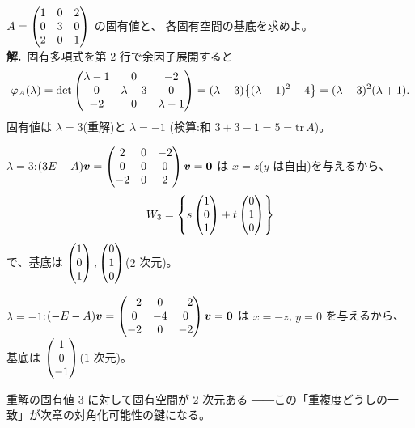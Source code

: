 \begin{rei}[例題・標準($3$ 次行列)]\label{rei:eigen-3x3}
$A = \begin{pmatrix}1 & 0 & 2 \\ 0 & 3 & 0 \\ 2 & 0 & 1\end{pmatrix}$ の固有値と、
各固有空間の基底を求めよ。\\
\textbf{解.}\ 固有多項式を第 $2$ 行で余因子展開すると
\[
\varphi_A(\lambda) = \det\begin{pmatrix}\lambda - 1 & 0 & -2 \\ 0 & \lambda - 3 & 0 \\
-2 & 0 & \lambda - 1\end{pmatrix}
= (\lambda - 3)\bigl\{(\lambda - 1)^2 - 4\bigr\}
= (\lambda - 3)^2(\lambda + 1).
\]
固有値は $\lambda = 3$(重解)と $\lambda = -1$
(検算:和 $3 + 3 - 1 = 5 = \mathrm{tr}\,A$)。

$\lambda = 3$:$(3E - A)\bm{v} = \begin{pmatrix}2 & 0 & -2 \\ 0 & 0 & 0 \\
-2 & 0 & 2\end{pmatrix}\bm{v} = \bm{0}$ は $x = z$($y$ は自由)を与えるから、
\[
W_3 = \left\{ s\begin{pmatrix}1 \\ 0 \\ 1\end{pmatrix} + t\begin{pmatrix}0 \\ 1 \\ 0\end{pmatrix} \right\}
\]
で、基底は $\begin{pmatrix}1 \\ 0 \\ 1\end{pmatrix}, \begin{pmatrix}0 \\ 1 \\ 0\end{pmatrix}$($2$ 次元)。

$\lambda = -1$:$(-E - A)\bm{v} = \begin{pmatrix}-2 & 0 & -2 \\ 0 & -4 & 0 \\
-2 & 0 & -2\end{pmatrix}\bm{v} = \bm{0}$ は $x = -z$, $y = 0$ を与えるから、
基底は $\begin{pmatrix}1 \\ 0 \\ -1\end{pmatrix}$($1$ 次元)。

重解の固有値 $3$ に対して固有空間が $2$ 次元ある
――この「重複度どうしの一致」が次章の対角化可能性の鍵になる。
\end{rei}

